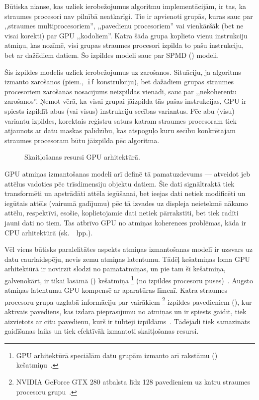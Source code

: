 Būtiska nianse, kas uzliek ierobežojumus algoritmu implementācijām, ir tas,
ka straumes procesori nav pilnībā neatkarīgi. Tie ir apvienoti grupās, kuras
sauc par ,,straumes multiprocesoriem'', ,,pavedienu procesoriem'' vai
vienkāršāk (bet ne visai korekti) par GPU ,,kodoliem''. Katra šāda grupa
koplieto vienu instrukciju atmiņu, kas nozīmē, visi grupas straumes
procesori izpilda to pašu instrukciju, bet ar dažādiem datiem.
Šo izpildes modeli sauc par SPMD ()
modeli.

Šis izpildes modelis uzliek ierobežojumus uz zarošanos.
Situāciju, ja algoritms izmanto
zarošanos (piem.,~\texttt{if} konstrukciju),
bet dažādiem grupas straumes procesoriem zarošanās nosacījums neizpildās
vienādi, sauc par ,,nekoherentu zarošanos''. Ņemot vērā, ka visai grupai
jāizpilda tās pašas instrukcijas, GPU ir spiests izpildīt
abus (vai visus) instrukciju secības variantus. Pēc abu (visu) variantu
izpildes, korektais reģistru saturs katram straumes procesoram tiek
atjaunots ar datu maskas palīdzību, kas atspoguļo kuru secību
konkrētajam straumes procesoram būtu jāizpilda pēc algoritma.
\cite{Owens-GPU}

\begin{figure}[tbh]
	\centering
	\def\svgscale{1.2}
	{}
	\caption{Skaitļošanas resursi GPU arhitektūrā.}
	\label{fig:gpu-arch}
\end{figure}

GPU atmiņas izmantošanas modeli arī definē tā pamatuzdevums --- atveidot jeb
 attēlus vadoties pēc trīsdimensiju objektu datiem.
Šie dati signāltraktā tiek transformēti un apstrādāti attēla iegūšanai,
bet ieejas dati  netiek modificēti
un iegūtais attēls (vairumā gadījumu) pēc tā izvades uz displeja neietekmē
nākamo attēlu, respektīvi, esošie, koplietojamie dati netiek pārrakstīti,
bet tiek radīti jauni dati no tiem. Tas atbrīvo GPU no atmiņas koherences
problēmas, kāda ir CPU arhitektūrā (sk.~\pageref{sec:cache}~lpp.).

Vēl viens būtisks paralelitātes aspekts atmiņas izmantošanas modelī ir
uzsvars uz datu caurlaidspēju, nevis zemu atmiņas latentumu.
Tādēļ kešatmiņas loma GPU arhitektūrā ir novirzīt slodzi no
pamatatmiņas, un pie tam šī kešatmiņa, galvenokārt, ir tikai lasāmā
() kešatmiņa%
\footnote{GPU arhitektūrā speciālām datu grupām izmanto arī
	rakstāmu () kešatmiņu~\cite{Owens-GPU}.}
(no izpildes procesoru puses)~\cite{Fatahalian}.
Augsto atmiņas latentumu GPU kompensē
ar  aparatūras līmenī.
Katra straumes procesoru grupa uzglabā informāciju
par vairākiem%
\footnote{NVIDIA GeForce GTX 280 atbalsta līdz 128 pavedieniem uz katru
	straumes procesoru grupu~\cite{Fatahalian}.}
izpildes pavedieniem (), kur aktīvais pavediens, kas izdara
pieprasījumu no atmiņas un ir spiests gaidīt, tiek aizvietots ar
citu pavedienu, kurš ir tūlītēji izpildāms~\cite{Fatahalian}.
Tādējādi tiek samazināts gaidīšanas laiks un tiek efektīvāk
izmantoti skaitļošanas resursi.
